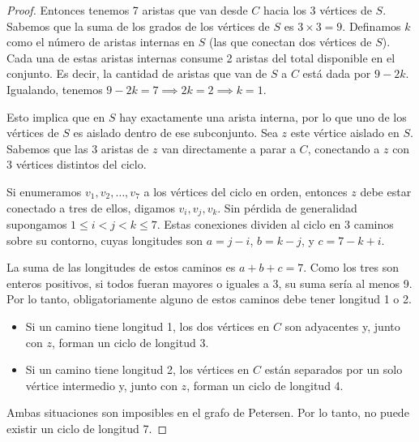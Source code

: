 \begin{proof}
    Entonces tenemos 7 aristas que van desde \( C \) hacia los 3 vértices de \( S \). Sabemos que la suma de los grados de los vértices de \( S \) es \( 3 \times 3 = 9 \). Definamos \( k \) como el número de aristas internas en \( S \) (las que conectan dos vértices de \( S \)). Cada una de estas aristas internas consume 2 aristas del total disponible en el conjunto. Es decir, la cantidad de aristas que van de \( S \) a \( C \) está dada por \( 9 - 2k \). Igualando, tenemos \( 9 - 2k = 7 \implies 2k = 2 \implies k = 1 \).

    Esto implica que en \( S \) hay exactamente una arista interna, por lo que uno de los vértices de \( S \) es aislado dentro de ese subconjunto. Sea \( z \) este vértice aislado en \( S \). Sabemos que las 3 aristas de \( z \) van directamente a parar a \( C \), conectando a \( z \) con 3 vértices distintos del ciclo.

    Si enumeramos \( v_1, v_2, \ldots, v_7 \) a los vértices del ciclo en orden, entonces \( z \) debe estar conectado a tres de ellos, digamos \( v_i, v_j, v_k \). Sin pérdida de generalidad supongamos \( 1 \leq i < j < k \leq 7 \). Estas conexiones dividen al ciclo en 3 caminos sobre su contorno, cuyas longitudes son \( a = j-i \), \( b = k-j \), y \( c = 7 - k + i \).

    La suma de las longitudes de estos caminos es \( a + b + c = 7 \). Como los tres son enteros positivos, si todos fueran mayores o iguales a 3, su suma sería al menos 9. Por lo tanto, obligatoriamente alguno de estos caminos debe tener longitud 1 o 2.
    \begin{itemize}
        \item Si un camino tiene longitud 1, los dos vértices en \( C \) son adyacentes y, junto con \( z \), forman un ciclo de longitud 3.
        \item Si un camino tiene longitud 2, los vértices en \( C \) están separados por un solo vértice intermedio y, junto con \( z \), forman un ciclo de longitud 4.
    \end{itemize}
    Ambas situaciones son imposibles en el grafo de Petersen. Por lo tanto, no puede existir un ciclo de longitud 7.
\end{proof}

\vspace{0.5cm}

